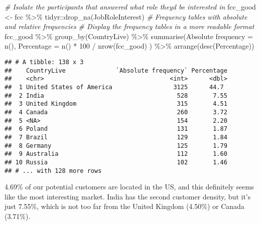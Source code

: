 \documentclass[
]{article}
\newenvironment{Shaded}{\begin{snugshade}}{\end{snugshade}}
\newcommand{\AttributeTok}[1]{\textcolor[rgb]{0.77,0.63,0.00}{#1}}
\newcommand{\CommentTok}[1]{\textcolor[rgb]{0.56,0.35,0.01}{\textit{#1}}}
\newcommand{\DecValTok}[1]{\textcolor[rgb]{0.00,0.00,0.81}{#1}}
\newcommand{\FunctionTok}[1]{\textcolor[rgb]{0.00,0.00,0.00}{#1}}
\newcommand{\NormalTok}[1]{#1}
\newcommand{\OtherTok}[1]{\textcolor[rgb]{0.56,0.35,0.01}{#1}}
\newcommand{\SpecialCharTok}[1]{\textcolor[rgb]{0.00,0.00,0.00}{#1}}
\newcommand{\StringTok}[1]{\textcolor[rgb]{0.31,0.60,0.02}{#1}}
\begin{document}
\begin{Shaded}
\begin{Highlighting}[]
\CommentTok{\# Isolate the participants that answered what role they\textquotesingle{}d be interested in}
\NormalTok{fcc\_good }\OtherTok{\textless{}{-}}\NormalTok{ fcc }\SpecialCharTok{\%\textgreater{}\%}
\NormalTok{  tidyr}\SpecialCharTok{::}\FunctionTok{drop\_na}\NormalTok{(JobRoleInterest) }
\CommentTok{\# Frequency tables with absolute and relative frequencies}
\CommentTok{\# Display the frequency tables in a more readable format}
\NormalTok{fcc\_good }\SpecialCharTok{\%\textgreater{}\%}
\FunctionTok{group\_by}\NormalTok{(CountryLive) }\SpecialCharTok{\%\textgreater{}\%}
\FunctionTok{summarise}\NormalTok{(}\StringTok{\textasciigrave{}}\AttributeTok{Absolute frequency}\StringTok{\textasciigrave{}} \OtherTok{=} \FunctionTok{n}\NormalTok{(),}
          \StringTok{\textasciigrave{}}\AttributeTok{Percentage}\StringTok{\textasciigrave{}} \OtherTok{=} \FunctionTok{n}\NormalTok{() }\SpecialCharTok{*} \DecValTok{100} \SpecialCharTok{/}  \FunctionTok{nrow}\NormalTok{(fcc\_good) ) }\SpecialCharTok{\%\textgreater{}\%}
  \FunctionTok{arrange}\NormalTok{(}\FunctionTok{desc}\NormalTok{(Percentage))}
\end{Highlighting}
\end{Shaded}

\begin{verbatim}
## # A tibble: 138 x 3
##    CountryLive              `Absolute frequency` Percentage
##    <chr>                                   <int>      <dbl>
##  1 United States of America                 3125      44.7 
##  2 India                                     528       7.55
##  3 United Kingdom                            315       4.51
##  4 Canada                                    260       3.72
##  5 <NA>                                      154       2.20
##  6 Poland                                    131       1.87
##  7 Brazil                                    129       1.84
##  8 Germany                                   125       1.79
##  9 Australia                                 112       1.60
## 10 Russia                                    102       1.46
## # ... with 128 more rows
\end{verbatim}

4.69\% of our potential customers are located in the US, and this
definitely seems like the most interesting market. India has the second
customer density, but it's just 7.55\%, which is not too far from the
United Kingdom (4.50\%) or Canada (3.71\%).
\end{document}
